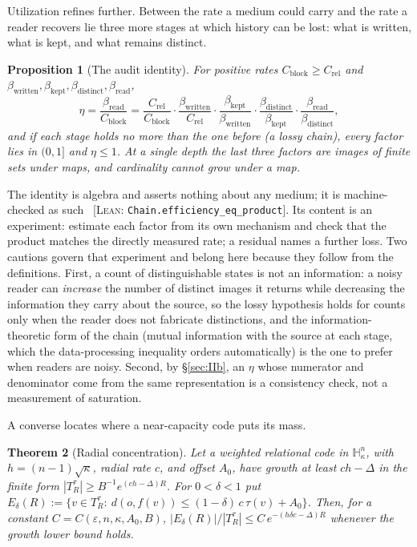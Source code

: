 \documentclass[11pt,reqno]{amsart}
\theoremstyle{plain}
\newtheorem{theorem}{Theorem}[section]
\newtheorem{proposition}[theorem]{Proposition}
\theoremstyle{definition}
\newcommand{\Crel}{C_{\mathrm{rel}}}
\newcommand{\Cblock}{C_{\mathrm{block}}}
\newcommand{\Hk}{\mathbb{H}^n_\kappa}
\newcommand{\eps}{\varepsilon}
\newcommand{\cert}[1]{{\footnotesize\ [\textsc{Lean}: \texttt{#1}]}}
\begin{document}
Utilization refines further. Between the rate a medium could carry and the rate a reader recovers lie three more stages at which history can be lost: what is written, what is kept, and what remains distinct.

\begin{proposition}[The audit identity]\label{prop:audit}
For positive rates $\Cblock\ge\Crel$ and $\beta_{\mathrm{written}},\beta_{\mathrm{kept}},\beta_{\mathrm{distinct}},\beta_{\mathrm{read}}$,
\[
\eta=\frac{\beta_{\mathrm{read}}}{\Cblock}
=\frac{\Crel}{\Cblock}\cdot\frac{\beta_{\mathrm{written}}}{\Crel}\cdot\frac{\beta_{\mathrm{kept}}}{\beta_{\mathrm{written}}}\cdot\frac{\beta_{\mathrm{distinct}}}{\beta_{\mathrm{kept}}}\cdot\frac{\beta_{\mathrm{read}}}{\beta_{\mathrm{distinct}}},
\]
and if each stage holds no more than the one before (a \emph{lossy} chain), every factor lies in $(0,1]$ and $\eta\le1$. At a single depth the last three factors are images of finite sets under maps, and cardinality cannot grow under a map.
\end{proposition}

The identity is algebra and asserts nothing about any medium; it is machine-checked as such \cert{Chain.efficiency\_eq\_product}. Its content is an experiment: estimate each factor from its own mechanism and check that the product matches the directly measured rate; a residual names a further loss. Two cautions govern that experiment and belong here because they follow from the definitions. First, a count of distinguishable states is not an information: a noisy reader can \emph{increase} the number of distinct images it returns while decreasing the information they carry about the source, so the lossy hypothesis holds for counts only when the reader does not fabricate distinctions, and the information-theoretic form of the chain (mutual information with the source at each stage, which the data-processing inequality orders automatically) is the one to prefer when readers are noisy. Second, by \S\ref{sec:IIb}, an $\eta$ whose numerator and denominator come from the same representation is a consistency check, not a measurement of saturation.

A converse locates where a near-capacity code puts its mass.

\begin{theorem}[Radial concentration]\label{thm:radial}
Let a weighted relational code in $\Hk$, with $h=(n-1)\sqrt\kappa$, radial rate $c$, and offset $A_0$, have growth at least $ch-\Delta$ in the finite form $|T_R^\tau|\ge B^{-1}e^{(ch-\Delta)R}$. For $0<\delta<1$ put $E_\delta(R):=\{v\in T_R^\tau:\ d(o,f(v))\le(1-\delta)\,c\,\tau(v)+A_0\}$. Then, for a constant $C=C(\eps,n,\kappa,A_0,B)$, $|E_\delta(R)|/|T_R^\tau|\le C\,e^{-(h\delta c-\Delta)R}$ whenever the growth lower bound holds.
\end{theorem}
\end{document}
